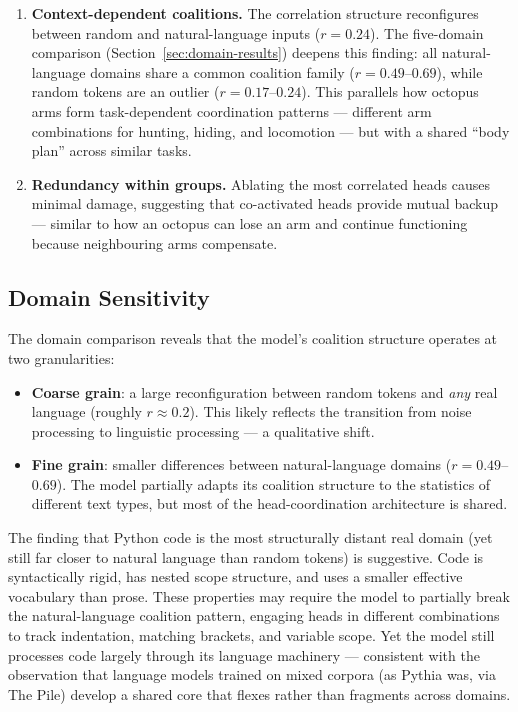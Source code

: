 \documentclass[11pt,a4paper]{article}
\begin{document}
\begin{enumerate}[itemsep=2pt]
    \item \textbf{Context-dependent coalitions.} The correlation structure reconfigures between random and natural-language inputs ($r = 0.24$). The five-domain comparison (Section~\ref{sec:domain-results}) deepens this finding: all natural-language domains share a common coalition family ($r = 0.49$--$0.69$), while random tokens are an outlier ($r = 0.17$--$0.24$). This parallels how octopus arms form task-dependent coordination patterns --- different arm combinations for hunting, hiding, and locomotion --- but with a shared ``body plan'' across similar tasks.
    \item \textbf{Redundancy within groups.} Ablating the most correlated heads causes minimal damage, suggesting that co-activated heads provide mutual backup --- similar to how an octopus can lose an arm and continue functioning because neighbouring arms compensate.
\end{enumerate}

\subsection{Domain Sensitivity}

The domain comparison reveals that the model's coalition structure operates at two granularities:

\begin{itemize}[itemsep=2pt]
    \item \textbf{Coarse grain}: a large reconfiguration between random tokens and \emph{any} real language (roughly $r \approx 0.2$). This likely reflects the transition from noise processing to linguistic processing --- a qualitative shift.
    \item \textbf{Fine grain}: smaller differences between natural-language domains ($r = 0.49$--$0.69$). The model partially adapts its coalition structure to the statistics of different text types, but most of the head-coordination architecture is shared.
\end{itemize}

The finding that Python code is the most structurally distant real domain (yet still far closer to natural language than random tokens) is suggestive.
Code is syntactically rigid, has nested scope structure, and uses a smaller effective vocabulary than prose.
These properties may require the model to partially break the natural-language coalition pattern, engaging heads in different combinations to track indentation, matching brackets, and variable scope.
Yet the model still processes code largely through its language machinery --- consistent with the observation that language models trained on mixed corpora (as Pythia was, via The Pile) develop a shared core that flexes rather than fragments across domains.
\end{document}
